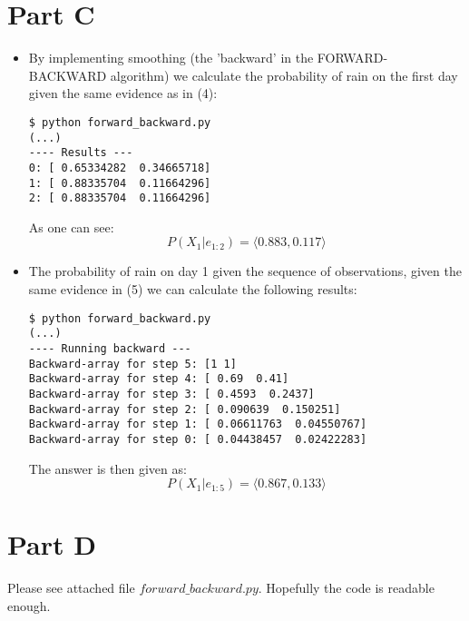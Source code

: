 \documentclass{article}
\begin{document}
\section*{Part C}

\begin{itemize}

\item By implementing smoothing (the 'backward' in the FORWARD-BACKWARD algorithm) we calculate the probability
of rain on the first day given the same evidence as in (4):

\begin{verbatim}
$ python forward_backward.py
(...)
---- Results ---
0: [ 0.65334282  0.34665718]
1: [ 0.88335704  0.11664296]
2: [ 0.88335704  0.11664296]
\end{verbatim}

As one can see:
\begin{equation}
P(X_1|e_{1:2}) = \langle0.883,0.117\rangle
\end{equation}

\item The probability of rain on day 1 given the sequence of observations, given the same evidence in (5) we
can calculate the following results:

\begin{verbatim}
$ python forward_backward.py
(...)
---- Running backward ---
Backward-array for step 5: [1 1] 
Backward-array for step 4: [ 0.69  0.41] 
Backward-array for step 3: [ 0.4593  0.2437] 
Backward-array for step 2: [ 0.090639  0.150251] 
Backward-array for step 1: [ 0.06611763  0.04550767] 
Backward-array for step 0: [ 0.04438457  0.02422283]
\end{verbatim}

The answer is then given as:
\begin{equation}
P(X_1|e_{1:5}) = \langle0.867, 0.133\rangle
\end{equation}
\end{itemize}

\section*{Part D}

Please see attached file {\bf $forward\_backward.py$}.
Hopefully the code is readable enough.
\end{document}

